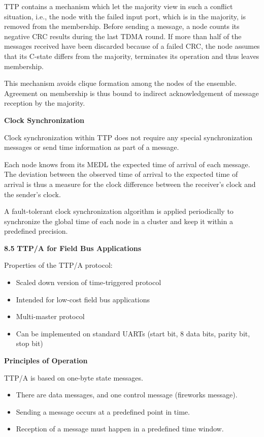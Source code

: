 TTP contains a mechanism which let the majority view in such a conflict
situation, i.e., the node with the failed input port, which is in the
majority, is removed from the membership. Before sending a message, a
node counts its negative CRC results during the last TDMA round. If more
than half of the messages received have been discarded because of a
failed CRC, the node assumes that its C-state differs from the majority,
terminates its operation and thus leaves membership.

This mechanism avoids clique formation among the nodes of the ensemble.
Agreement on membership is thus bound to indirect acknowledgement of
message reception by the majority.

\textbf{Clock Synchronization}

Clock synchronization within TTP does not require any special
synchronization messages or send time information as part of a message.

Each node knows from its MEDL the expected time of arrival of each
message. The deviation between the observed time of arrival to the
expected time of arrival is thus a measure for the clock difference
between the receiver's clock and the sender's clock.

A fault-tolerant clock synchronization algorithm is applied periodically
to synchronize the global time of each node in a cluster and keep it
within a predefined precision.

\textbf{8.5} \protect\hypertarget{teil6}{}{}\textbf{TTP/A for Field Bus
Applications}

Properties of the TTP/A protocol:

\begin{itemize}
\item
  Scaled down version of time-triggered protocol
\item
  Intended for low-cost field bus applications
\item
  Multi-master protocol
\item
  Can be implemented on standard UARTs (start bit, 8 data bits, parity
  bit, stop bit)
\end{itemize}

\textbf{Principles of Operation}

TTP/A is based on one-byte state messages.

\begin{itemize}
\item
  There are data messages, and one control message (fireworks message).
\item
  Sending a message occurs at a predefined point in time.
\item
  Reception of a message must happen in a predefined time window.
\end{itemize}

